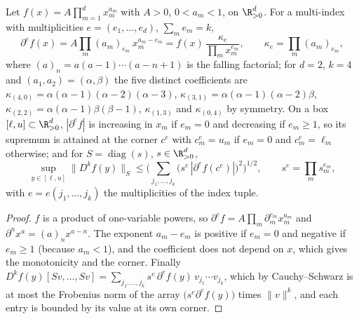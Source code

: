 \begin{lemma}\label{lem:cd4}
Let $f(x)=A\prod_{m=1}^dx_m^{a_m}$ with $A>0$, $0<a_m<1$, on $\R^d_{>0}$. For a multi-index with multiplicities $e=(e_1,\dots,e_d)$, $\sum_me_m=k$,
\[
\partial^e\!f(x)=A\prod_m(a_m)_{e_m}\,x_m^{a_m-e_m}=f(x)\,\frac{\kappa_e}{\prod_mx_m^{e_m}},\qquad \kappa_e=\prod_m(a_m)_{e_m},
\]
where $(a)_n=a(a-1)\cdots(a-n+1)$ is the falling factorial; for $d=2$, $k=4$ and $(a_1,a_2)=(\alpha,\beta)$ the five distinct coefficients are $\kappa_{(4,0)}=\alpha(\alpha-1)(\alpha-2)(\alpha-3)$, $\kappa_{(3,1)}=\alpha(\alpha-1)(\alpha-2)\beta$, $\kappa_{(2,2)}=\alpha(\alpha-1)\beta(\beta-1)$, $\kappa_{(1,3)}$ and $\kappa_{(0,4)}$ by symmetry. On a box $[\ell,u]\subset\R^d_{>0}$, $|\partial^e\!f|$ is increasing in $x_m$ if $e_m=0$ and decreasing if $e_m\ge1$, so its supremum is attained at the corner $c^e$ with $c^e_m=u_m$ if $e_m=0$ and $c^e_m=\ell_m$ otherwise; and for $S=\operatorname{diag}(s)$, $s\in\R^d_{>0}$,
\[
\sup_{y\in[\ell,u]}\|D^k\!f(y)\|_S\le\Big(\sum_{j_1,\dots,j_k}\big(s^{e}\,|\partial^e\!f(c^e)|\big)^2\Big)^{1/2},\qquad s^e=\prod_ms_m^{e_m},
\]
with $e=e(j_1,\dots,j_k)$ the multiplicities of the index tuple.
\end{lemma}
\begin{proof}
$f$ is a product of one-variable powers, so $\partial^e\!f=A\prod_m\partial_m^{e_m}x_m^{a_m}$ and $\partial^n x^a=(a)_nx^{a-n}$. The exponent $a_m-e_m$ is positive if $e_m=0$ and negative if $e_m\ge1$ (because $a_m<1$), and the coefficient does not depend on $x$, which gives the monotonicity and the corner. Finally $D^k\!f(y)[Sv,\dots,Sv]=\sum_{j_1,\dots,j_k}s^{e}\,\partial^e\!f(y)\,v_{j_1}\cdots v_{j_k}$, which by Cauchy--Schwarz is at most the Frobenius norm of the array $\big(s^e\partial^e\!f(y)\big)$ times $\|v\|^k$, and each entry is bounded by its value at its own corner.
\end{proof}

